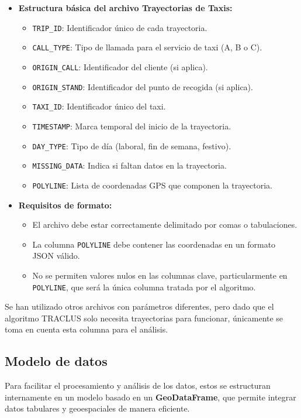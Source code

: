 \begin{itemize}
    \item \textbf{Estructura básica del archivo Trayectorias de Taxis:}
    \begin{itemize}
        \item \texttt{TRIP\_ID}: Identificador único de cada trayectoria.
        \item \texttt{CALL\_TYPE}: Tipo de llamada para el servicio de taxi (A, B o C).
        \item \texttt{ORIGIN\_CALL}: Identificador del cliente (si aplica).
        \item \texttt{ORIGIN\_STAND}: Identificador del punto de recogida (si aplica).
        \item \texttt{TAXI\_ID}: Identificador único del taxi.
        \item \texttt{TIMESTAMP}: Marca temporal del inicio de la trayectoria.
        \item \texttt{DAY\_TYPE}: Tipo de día (laboral, fin de semana, festivo).
        \item \texttt{MISSING\_DATA}: Indica si faltan datos en la trayectoria.
        \item \texttt{POLYLINE}: Lista de coordenadas GPS que componen la trayectoria.
    \end{itemize}
    \item \textbf{Requisitos de formato:}
    \begin{itemize}
        \item El archivo debe estar correctamente delimitado por comas o tabulaciones.
        \item La columna \texttt{POLYLINE} debe contener las coordenadas en un formato JSON válido.
        \item No se permiten valores nulos en las columnas clave, particularmente en \texttt{POLYLINE}, que será la única columna tratada por el algoritmo.
    \end{itemize}
\end{itemize}

Se han utilizado otros archivos con parámetros diferentes, pero dado que el algoritmo TRACLUS solo necesita trayectorias para funcionar, únicamente se toma en cuenta esta columna para el análisis.

\subsection{Modelo de datos}

Para facilitar el procesamiento y análisis de los datos, estos se estructuran internamente en un modelo basado en un \textbf{GeoDataFrame}, que permite integrar datos tabulares y geoespaciales de manera eficiente.

